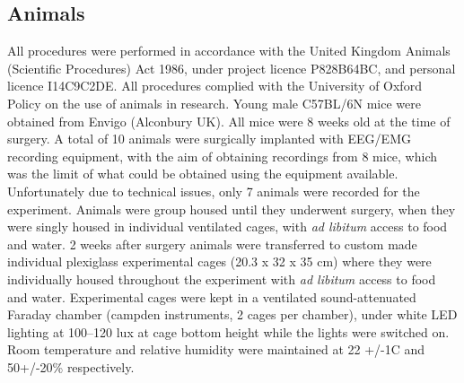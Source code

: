 \subsection{Animals}
All procedures were performed in accordance with the United Kingdom Animals
(Scientific Procedures) Act 1986, under project licence P828B64BC,
and personal licence I14C9C2DE.
All procedures complied with the University of Oxford Policy on the use of
animals in research.
Young male C57BL/6N mice were obtained from Envigo (Alconbury UK).
All mice
were 8 weeks old at the time of surgery.
A total of 10 animals were surgically implanted with EEG/EMG 
recording equipment, with the aim
of obtaining recordings from 8 mice, which was the limit of what could be
obtained using the equipment available.
Unfortunately due to technical issues, only 7 animals were recorded for the
experiment.
Animals were group housed until they underwent surgery, when they were singly
housed in individual ventilated cages, with \emph{ad libitum} access to food
and water.
2 weeks after surgery animals were transferred to custom made individual
plexiglass experimental cages (20.3 x 32 x 35 cm) where they were 
individually housed
throughout the experiment with \emph{ad libitum} access to food and water.
Experimental cages were kept in a ventilated sound-attenuated Faraday chamber
(campden instruments, 2 cages per chamber), under white LED lighting 
at 100--120 lux at cage bottom height while the lights were switched on.
Room temperature and relative humidity were maintained at 22 +/-1C and
50+/-20\% respectively.

